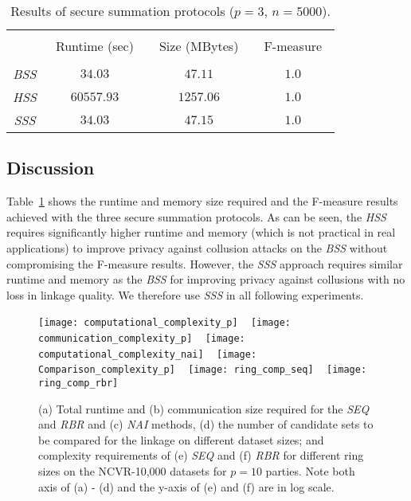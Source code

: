\documentclass{sig-alternate}
\begin{document}
\begin{table}[t!]
\centering
 \begin{tabular}{c|ccc} \hline
 \\[-2mm]
  ~ & ~Runtime (sec)~ & ~Size (MBytes)~ & ~F-measure~ \\ 
  \hline
  \\[-2mm]
  \emph{BSS} & $34.03$ & $47.11$ & $1.0$ \\
  \emph{HSS} & $60557.93$ & $1257.06$ & $1.0$ \\
  \emph{SSS} & $34.03$ & $47.15$ & $1.0$ \\
  \hline
  \end{tabular}
 \caption{Results of secure summation protocols ($p=3$, $n=5000$).}
\label{sec_sum_results}
\end{table}

\subsection{Discussion}
\label{sec-discussion}

Table~\ref{sec_sum_results} shows the runtime and memory size
required and the F-measure results
achieved with the three secure summation protocols.
As can be seen, the \emph{HSS} requires significantly higher
runtime and memory (which is not practical in real applications)
to improve privacy against collusion attacks on the \emph{BSS}
without compromising the F-measure results. 
However, the
\emph{SSS} approach
requires similar runtime and memory as the \emph{BSS}
for improving privacy against collusions with no loss
in linkage quality.
We therefore use \emph{SSS} in all following experiments.

\begin{figure*}[!th]
  \centering
 \texttt{[image: computational\_complexity\_p]}
 ~
 \texttt{[image: communication\_complexity\_p]}
~
 \texttt{[image: computational\_complexity\_nai]}
~
 \texttt{[image: Comparison\_complexity\_p]}
~
 \texttt{[image: ring\_comp\_seq]}
~
 \texttt{[image: ring\_comp\_rbr]}
 
  \caption{\small{(a) Total runtime and (b) communication size
    required for the \emph{SEQ} and \emph{RBR} and (c) \emph{NAI} methods,
    (d) the
    number of candidate sets to be compared for the linkage
    on different dataset sizes; and complexity requirements
    of (e) \emph{SEQ} and (f) \emph{RBR} for different ring sizes on the
    NCVR-10,000 datasets for $p=10$ parties. Note both axis of (a) - (d) 
    and the y-axis of (e) and (f) are in
    log scale. 
   }
    }
\label{fig:scal}
\end{figure*}
\end{document}
